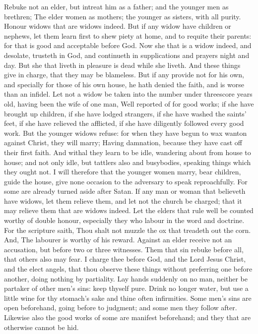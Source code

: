 Rebuke not an elder, but intreat him as a father; and the
younger men as brethren;  The elder women as mothers; the
younger as sisters, with all purity.  Honour widows that
are widows indeed.  But if any widow have children or
nephews, let them learn first to shew piety at home, and to requite
their parents: for that is good and acceptable before God.
 Now she that is a widow indeed, and desolate, trusteth in
God, and continueth in supplications and prayers night and day.
 But she that liveth in pleasure is dead while she liveth.
 And these things give in charge, that they may be
blameless.  But if any provide not for his own, and
specially for those of his own house, he hath denied the faith, and is
worse than an infidel.  Let not a widow be taken into the
number under threescore years old, having been the wife of one man,
 Well reported of for good works; if she have brought up
children, if she have lodged strangers, if she have washed the saints'
feet, if she have relieved the afflicted, if she have diligently
followed every good work.  But the younger widows refuse:
for when they have begun to wax wanton against Christ, they will marry;
 Having damnation, because they have cast off their first
faith.  And withal they learn to be idle, wandering about
from house to house; and not only idle, but tattlers also and
busybodies, speaking things which they ought not.  I will
therefore that the younger women marry, bear children, guide the house,
give none occasion to the adversary to speak reproachfully.
 For some are already turned aside after Satan.
 If any man or woman that believeth have widows, let them
relieve them, and let not the church be charged; that it may relieve
them that are widows indeed.  Let the elders that rule
well be counted worthy of double honour, especially they who labour in
the word and doctrine.  For the scripture saith, Thou
shalt not muzzle the ox that treadeth out the corn. And, The labourer is
worthy of his reward.  Against an elder receive not an
accusation, but before two or three witnesses.  Them that
sin rebuke before all, that others also may fear.  I
charge thee before God, and the Lord Jesus Christ, and the elect angels,
that thou observe these things without preferring one before another,
doing nothing by partiality.  Lay hands suddenly on no
man, neither be partaker of other men's sins: keep thyself pure.
 Drink no longer water, but use a little wine for thy
stomach's sake and thine often infirmities.  Some men's
sins are open beforehand, going before to judgment; and some men they
follow after.  Likewise also the good works of some are
manifest beforehand; and they that are otherwise cannot be hid.


